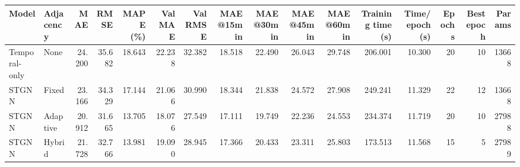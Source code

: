 \begin{tabular}{llrrrrrrrrrrrrrr}
\toprule
Model & Adjacency & MAE & RMSE & MAPE (\%) & Val MAE & Val RMSE & MAE@15min & MAE@30min & MAE@45min & MAE@60min & Training time (s) & Time/epoch (s) & Epochs & Best epoch & Params \\
\midrule
Temporal-only & None & 24.200 & 35.682 & 18.643 & 22.238 & 32.382 & 18.518 & 22.490 & 26.043 & 29.748 & 206.001 & 10.300 & 20 & 10 & 13668 \\
STGNN & Fixed & 23.166 & 34.329 & 17.144 & 21.066 & 30.990 & 18.344 & 21.838 & 24.572 & 27.908 & 249.241 & 11.329 & 22 & 12 & 13668 \\
STGNN & Adaptive & 20.912 & 31.665 & 13.705 & 18.076 & 27.549 & 17.111 & 19.749 & 22.236 & 24.553 & 234.374 & 11.719 & 20 & 10 & 27988 \\
STGNN & Hybrid & 21.728 & 32.766 & 13.981 & 19.090 & 28.945 & 17.366 & 20.433 & 23.311 & 25.803 & 173.513 & 11.568 & 15 & 5 & 27989 \\
\bottomrule
\end{tabular}

